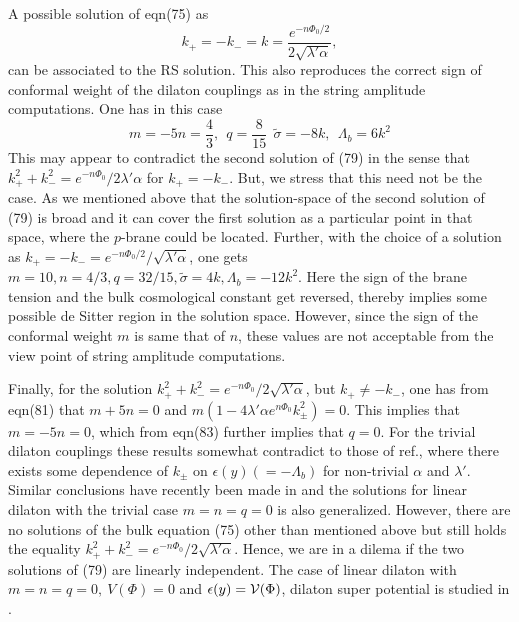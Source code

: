 \documentclass[a4paper,12pt]{article}
\begin{document}
A possible solution of eqn(75) as 
\begin{equation}
k_+=-k_-=k=\frac{e^{-n\Phi_0/2}}{2\sqrt{\lambda'\alpha}}, 
\end{equation}
can be associated to the RS solution. This also reproduces 
the correct sign of conformal weight of the dilaton couplings as in the 
string amplitude computations. One has in this case 
\begin{equation}
m=-5n=\frac{4}{3}, ~~  q=\frac{8}{15}~~ \tilde{\sigma}
=-8k,~~\Lambda_b=6k^2 
\end{equation}           
This may appear to contradict the second solution of (79) in the sense 
that $k_+^2+k_-^2= e^{-n\Phi_0}/{2\lambda'\alpha}$ for $k_+=-k_-$. But, 
we stress that this need not be the case. As we mentioned 
above that the solution-space of the second solution of (79) is broad and it 
can cover the first solution as a particular point in that space, where the 
$p$-brane could be located. Further, with the choice of a solution as  
$k_+=-k_-= e^{-n\Phi_0/2}/{\sqrt{\lambda'\alpha}}$, one gets  
$m= 10,  n= 4/3,  q= 32/15,  \tilde{\sigma} = 4k,  \Lambda_b= -12k^2$. 
Here the sign of the brane tension and the bulk cosmological constant get 
reversed, thereby implies some possible de Sitter region in the solution 
space. However, since the sign of the conformal weight $m$ is same that of 
$n$, these values are not acceptable from the view point of string 
amplitude computations.        

Finally, for the solution 
$k_+^2+k_-^2=e^{-n\Phi_0}/{2\sqrt{\lambda'\alpha}}$, but 
$k_+\neq -k_-$, one has from eqn(81) that $m+5n=0$ and 
$m(1-4\lambda'\alpha e^{n\Phi_0} k_{\pm}^2)=0$. This implies that $m=-5n=0$, which from 
eqn(83) further implies that $q=0$. For the trivial dilaton couplings 
these results somewhat contradict to those of ref.\cite{KKL}, where there 
exists some dependence of $k_{\pm}$ on $\epsilon(y)(=-\Lambda_b)$ for 
non-trivial $\alpha$ and $\lambda'$. Similar conclusions have recently 
been made in \cite{NIC} and the solutions for linear dilaton with the 
trivial case $m=n=q=0$ is also generalized. However, there are no solutions 
of the bulk equation (75) other than mentioned above but still holds 
the equality $k_+^2+k_-^2=e^{-n\Phi_0}/{2\sqrt{\lambda'\alpha}}$. 
Hence, we are in a dilema if the two solutions of (79) are linearly 
independent. The case of linear dilaton with $m=n=q=0,~ V(\Phi)=0$ and 
$\epsilon(y)={\cal V}(\Phi)$, dilaton super potential is studied in 
\cite{ILZ}.
\end{document}
